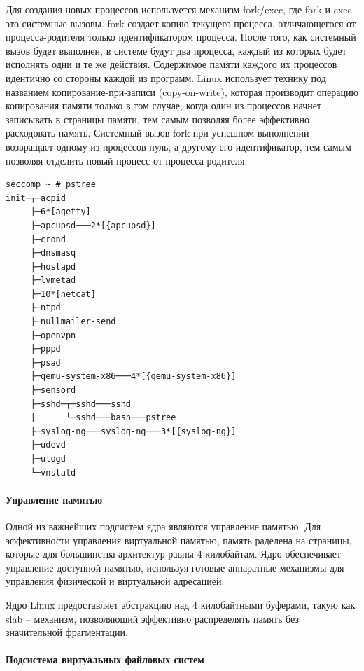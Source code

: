 \documentclass{gost7.32-2001}
\begin{document}
Для создания новых процессов используется механизм fork/exec, где fork
и exec это системные вызовы. fork создает копию текущего процесса,
отличающегося от процесса-родителя только идентификатором
процесса. После того, как системный вызов будет выполнен, в системе
будут два процесса, каждый из которых будет исполнять одни и те же
действия. Содержимое памяти каждого их процессов идентично со стороны
каждой из программ. Linux использует технику под названием
копирование-при-записи (copy-on-write), которая производит операцию
копирования памяти только в том случае, когда один из процессов начнет
записывать в страницы памяти, тем самым позволяя более эффективно
расходовать память. Системный вызов fork при успешном выполнении
возвращает одному из процессов нуль, а другому его идентификатор, тем
самым позволяя отделить новый процесс от процесса-родителя.

\begin{lstlisting}[caption={Дерево процессов}, captionpos=b, float,
    label={lst:pstree}]
seccomp ~ # pstree
init─┬─acpid
     ├─6*[agetty]
     ├─apcupsd───2*[{apcupsd}]
     ├─crond
     ├─dnsmasq
     ├─hostapd
     ├─lvmetad
     ├─10*[netcat]
     ├─ntpd
     ├─nullmailer-send
     ├─openvpn
     ├─pppd
     ├─psad
     ├─qemu-system-x86───4*[{qemu-system-x86}]
     ├─sensord
     ├─sshd─┬─sshd───sshd
     │      └─sshd───bash───pstree
     ├─syslog-ng───syslog-ng───3*[{syslog-ng}]
     ├─udevd
     ├─ulogd
     └─vnstatd
\end{lstlisting}

\paragraph{Управление памятью}
Одной из важнейших подсистем ядра являются управление памятью. Для
эффективности управления виртуальной памятью, память раделена на
страницы, которые для большинства архитектур равны 4 килобайтам. Ядро
обеспечивает управление доступной памятью, используя готовые
аппаратные механизмы для управления физической и виртуальной
адресацией.

Ядро Linux предоставляет абстракцию над 4 килобайтными буферами, такую
как slab – механизм, позволяющий эффективно распределять память без
значительной фрагментации.

\paragraph{Подсистема виртуальных файловых систем}
\label{sec:vfs}
\end{document}
